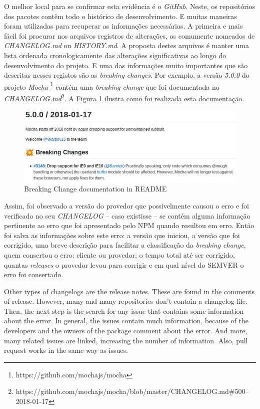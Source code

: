 O melhor local para se confirmar esta evidência é o \textit{GitHub}. Neste, os repositórios dos pacotes contêm todo o histórico de desenvolvimento. E muitas maneiras foram utilizadas para recuperar as informações necessárias. A primeira e mais fácil foi procurar nos arquivos registros de alterações, os comumente nomeados de \textit{CHANGELOG.md} ou \textit{HISTORY.md}. A proposta destes arquivos é manter uma lista ordenada cronologicamente das alterações significativas ao longo do desenvolvimento do projeto. E uma das informações muito importantes que são descritas nesses registos são as \textit{breaking changes}. Por exemplo, a versão \textit{5.0.0} do projeto \textit{Mocha} \footnote{https://github.com/mochajs/mocha} contém uma \textit{breaking change} que foi documentada no \textit{CHANGELOG.md}\footnote{https://github.com/mochajs/mocha/blob/master/CHANGELOG.md\#500--2018-01-17}. A Figura \ref{fig:bc_documentation} ilustra como foi realizada esta documentação.

\begin{figure}
    \centering
    \includegraphics[scale=0.55]{figuras/bc_documentation.jpeg}
    \caption{Breaking Change documentation in README}
    \label{fig:bc_documentation}
\end{figure}{}

Assim, foi observado a versão do provedor que possivelmente causou o erro e foi verificado no seu \textit{CHANGELOG} -- caso existisse -- se contém alguma informação pertinente ao erro que foi apresentado pelo \gls{NPM} quando resultou em erro. Então foi salva as informações sobre este erro: a versão que iniciou, a versão que foi corrigido, uma breve descrição para facilitar a classificação da \textit{breaking change}, quem consertou o erro: cliente ou provedor; o tempo total até ser corrigido, quantas \textit{releases} o provedor levou para corrigir e em qual nível do \gls{SEMVER} o erro foi consertado.

Other types of changelogs are the release notes. These are found in the comments of release. However, many and many repositories don’t contain a changelog file. Then, the next step is the search for any issue that contains some information about the error. In general, the issues contain much information, because of the developers and the owners of the package comment about the error. And more, many related issues are linked, increasing the number of information. Also, pull request works in the same way as issues.

